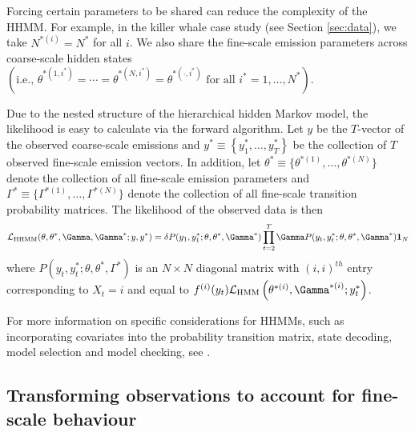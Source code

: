 Forcing certain parameters to be shared can reduce the complexity of the HHMM. For example, in the killer whale case study (see Section \ref{sec:data}), we take $N^{*(i)} = N^*$ for all $i$. We also share the fine-scale emission parameters across coarse-scale hidden states $\left( \text{i.e., } \theta^{*(1,i^*)} = \cdots = \theta^{*(N,i^*)} = \theta^{*(\cdot,i^*)} \text{ for all } i^* = 1, \ldots, N^* \right)$. 

Due to the nested structure of the hierarchical hidden Markov model, the likelihood is easy to calculate via the forward algorithm.
%
Let $y$ be the $T$-vector of the observed coarse-scale emissions and
$y^* \equiv \left\{y^*_1, \ldots,y^*_T\right\}$ be the collection of $T$ observed fine-scale emission vectors.
%
In addition, let $\theta^* \equiv \{\theta^{*(1)}, \ldots, \theta^{*(N)}\}$ denote the collection of all fine-scale emission parameters and $\Gamma^* \equiv \{\Gamma^{*(1)}, \ldots, \Gamma^{*(N)}\}$ denote the collection of all fine-scale transition probability matrices. The likelihood of the observed data is then
%
\begin{equation}
    \calL_{\text{HHMM}}(\theta,\theta^*,\Gamma,\Gamma^*;y,y^*) = \delta P(y_1,y_1^*;\theta,\theta^*,\Gamma^*) \prod_{t=2}^T \Gamma P(y_t,y_t^*;\theta,\theta^*,\Gamma^*) \mathbf{1}_N
    \label{eqn:HHMM_likelihood}
\end{equation}
%
where $P(y_t,y_t^*;\theta,\theta^*,\Gamma^*)$ is an $N \times N$ diagonal matrix with $(i,i)^{th}$ entry corresponding to $X_t=i$ and equal to 
$f^{(i)}(y_t)\calL_{\text{HMM}}\left(\theta^{*(i)},
\Gamma^{*(i)};y_t^*\right)$. 

For more information on specific considerations for HHMMs, such as incorporating covariates into the probability transition matrix, state decoding, model selection and model checking, see \citet{Adam:2019}. 

\subsection{Transforming observations to account for fine-scale behaviour}
\label{subsec:STFT}

